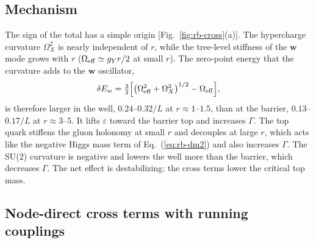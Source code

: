 \subsection{Mechanism}
\label{sec:rb-xmech}

The sign of the total has a simple origin [Fig.~\ref{fig:rb-cross}(a)].
The hypercharge curvature $\Omega_X^2$ is nearly independent of $r$, while the tree-level stiffness of the $\bm w$ mode grows with $r$ ($\Omega_{\rm eff}\simeq g_Yr/2$ at small $r$).
The zero-point energy that the curvature adds to the $\bm w$ oscillator,
\begin{equation}
\delta E_w=\tfrac32\Bigl[\bigl(\Omega_{\rm eff}^2+\Omega_X^2\bigr)^{1/2}-\Omega_{\rm eff}\Bigr],
\label{eq:rb-dEw}
\end{equation}
is therefore larger in the well, $0.24$--$0.32/L$ at $r\approx1$--$1.5$, than at the barrier, $0.13$--$0.17/L$ at $r\approx3$--$5$. %
It lifts $\varepsilon$ toward the barrier top and increases $\Gamma$.
The top quark stiffens the gluon holonomy at small $r$ and decouples at large $r$, which acts like the negative Higgs mass term of Eq.~(\ref{eq:rb-dm2}) and also increases $\Gamma$.
The SU(2) curvature is negative and lowers the well more than the barrier, which decreases $\Gamma$.
The net effect is destabilizing: the cross terms lower the critical top mass.

\subsection{Node-direct cross terms with running couplings}
\label{sec:rb-xdirect}

